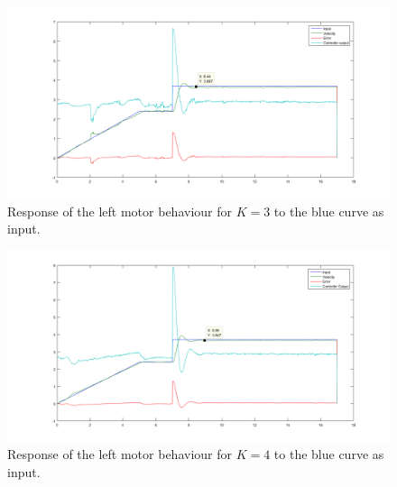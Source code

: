 \begin{figure}[htbp]
\centering
\includegraphics[width = \textwidth]{pics/RM_K3.png}
\caption{Response of the left motor behaviour for $K = 3$ to the blue curve as input.}
\label{fig:RM_K3}
\end{figure}

\begin{figure}[htbp]
\centering
\includegraphics[width = \textwidth]{pics/RM_K4.png}
\caption{Response of the left motor behaviour for $K = 4$ to the blue curve as input.}
\label{fig:RM_K4}
\end{figure}


